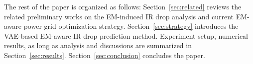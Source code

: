The rest of the paper is organized as follows: Section~\ref{sec:related} reviews the related preliminary works on the EM-induced IR drop analysis and current EM-aware power grid optimization strategy. Section~\ref{sec:strategy} introduces the VAE-based EM-aware IR drop prediction method. Experiment setup, numerical results, as long as analysis and discussions are summarized in Section~\ref{sec:results}.  Section~\ref{sec:conclusion} concludes the paper.